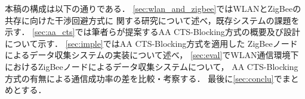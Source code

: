 \documentclass[technicalreport]{ieicej}
\begin{document}
本稿の構成は以下の通りである．
\ref{sec:wlan_and_zigbee}ではWLANとZigBeeの共存に向けた干渉回避方式に
関する研究について述べ，既存システムの課題を示す．
\ref{sec:aa_cts}では筆者らが提案するAA CTS-Blocking方式の概要及び設計について示す．
\ref{sec:imple}ではAA CTS-Blocking方式を適用した
ZigBeeノードによるデータ収集システムの実装について述べ，
\ref{sec:eval}でWLAN通信環境下におけるZigBeeノードによるデータ収集システムについて，
AA CTS-Blocking方式の有無による通信成功率の差を比較・考察する．
最後に\ref{sec:conclu}でまとめとする．




\end{document}
